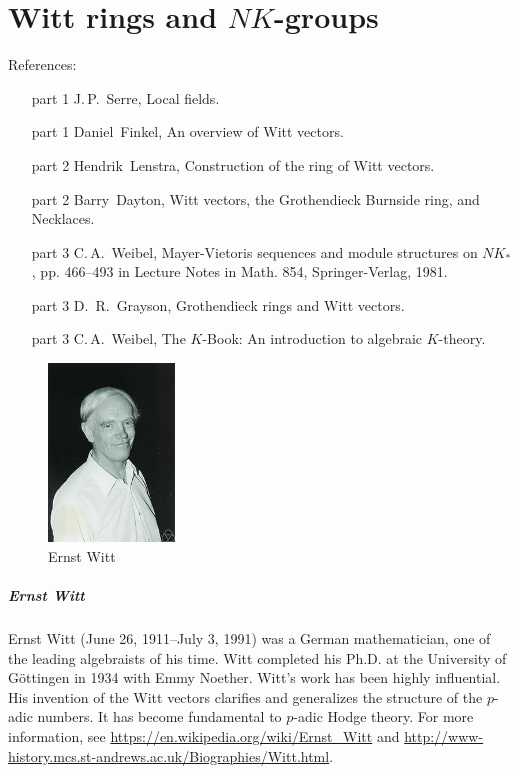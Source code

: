 \chapter{Witt rings and $NK$-groups}
References:
\begin{itemize}
    \item[part 1] J.\,P.\ Serre, Local fields.
    \item[part 1] Daniel\ Finkel, An overview of Witt vectors.
    \item[part 2] Hendrik\ Lenstra, Construction of the ring of Witt vectors.
    \item[part 2] Barry\ Dayton, Witt vectors, the Grothendieck Burnside ring, and Necklaces.
	\item[part 3] C.\,A.\ Weibel, Mayer-Vietoris sequences and module structures on $NK_*$, pp. 466–493 in Lecture Notes in Math. 854, Springer-Verlag, 1981.
	\item[part 3] D.\, R.\ Grayson, Grothendieck rings and Witt vectors.
	\item[part 3] C.\,A.\ Weibel, The $K$-Book: An introduction to algebraic $K$-theory.
\end{itemize}
\begin{figure}[htbp]
	\centering
	\includegraphics[width=0.3\textwidth]{./figures/Witt}
	\caption{Ernst Witt}
\end{figure}
\paragraph{Ernst Witt} %
\label{par:ernst_witt}
Ernst Witt (June 26, 1911--July 3, 1991) was a German mathematician, one of the leading algebraists of his time. Witt completed his Ph.D. at the University of G\"{o}ttingen in 1934 with Emmy Noether. Witt's work has been highly influential. His invention of the Witt vectors clarifies and generalizes the structure of the $p$-adic numbers. It has become fundamental to $p$-adic Hodge theory. For more information, see \url{https://en.wikipedia.org/wiki/Ernst_Witt} and \url{http://www-history.mcs.st-andrews.ac.uk/Biographies/Witt.html}.

